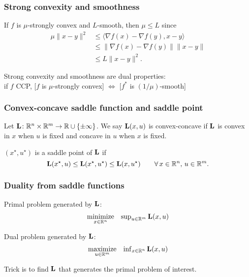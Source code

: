 \documentclass[10pt,mathserif]{beamer}
\begin{document}
\begin{frame}
\frametitle{Strong convexity and smoothness}
If $f$ is $\mu$-strongly convex and $L$-smooth, then $\mu\le L$ since
\begin{align*}
\mu\|x-y\|^2&\le \langle \nabla f(x)-\nabla f(y),x-y\rangle\\
&\le \| \nabla f(x)-\nabla f(y)\|\|x-y\|\\
&\le L\|x-y\|^2.
\end{align*}

\vspace{0.2in}
Strong convexity and smoothness are dual properties:\\
if $f$ CCP, [$f$ is $\mu$-strongly convex] $\Leftrightarrow$ [$f^*$ is $(1/\mu)$-smooth]

\end{frame}






\begin{frame}
\frametitle{Convex-concave saddle function and saddle point}
Let $\mathbf{L}\colon\mathbb{R}^{n}\times\mathbb{R}^m\rightarrow\mathbb{R}\cup\{\pm\infty\}$.
We say $\mathbf{L}(x,u)$ is convex-concave if $\mathbf{L}$ is convex in $x$ when $u$ is fixed and concave in $u$ when $x$ is fixed.

\vspace{0.2in}
$(x^\star,u^\star)$ is a saddle point of $\mathbf{L}$ if
\[
\mathbf{L}(x^\star,u)\le \mathbf{L}(x^\star,u^\star)\le \mathbf{L}(x,u^\star)
\qquad\forall\,x\in \mathbb{R}^n,\,u\in \mathbb{R}^m.
\]

\end{frame}

\begin{frame}
\frametitle{Duality from saddle functions}
Primal problem generated by $\mathbf{L}$:
\[
\begin{array}{ll}
\underset{x\in \mathbb{R}^n}{\mbox{minimize}}&\sup_{u\in \mathbb{R}^m} \mathbf{L}(x,u)
\end{array}
\]
\vspace{0.2in}

Dual problem generated by $\mathbf{L}$:
\[
\begin{array}{ll}
\underset{u\in \mathbb{R}^m}{\mbox{maximize}}&\inf_{x\in \mathbb{R}^n} \mathbf{L}(x,u)
\end{array}
\]
\vspace{0.2in}



Trick is to find $\mathbf{L}$ that generates the primal problem of interest.
\end{frame}
\end{document}
